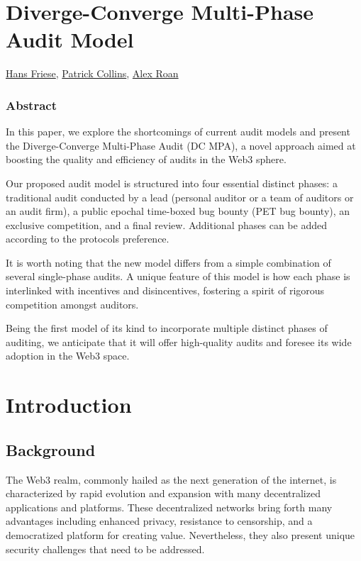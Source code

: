 \documentclass[10pt]{extarticle}
\begin{document}
\section*{Diverge-Converge Multi-Phase Audit
Model}\label{diverge-converge-multi-phase-audit-model}

\href{hans@cyfrin.io}{Hans Friese}, \href{patrick@cyfrin.io}{Patrick
Collins}, \href{alex@cyfrin.io}{Alex Roan}

\subsubsection*{Abstract}\label{abstract}

In this paper, we explore the shortcomings of current audit models and
present the Diverge-Converge Multi-Phase Audit (DC MPA), a novel
approach aimed at boosting the quality and efficiency of audits in the
Web3 sphere.

Our proposed audit model is structured into four essential distinct
phases: a traditional audit conducted by a lead (personal auditor or a
team of auditors or an audit firm), a public epochal time-boxed bug
bounty (PET bug bounty), an exclusive competition, and a final review.
Additional phases can be added according to the
protocol\textquotesingle s preference.

It is worth noting that the new model differs from a simple combination
of several single-phase audits. A unique feature of this model is how
each phase is interlinked with incentives and disincentives, fostering a
spirit of rigorous competition amongst auditors.

Being the first model of its kind to incorporate multiple distinct
phases of auditing, we anticipate that it will offer high-quality audits
and foresee its wide adoption in the Web3 space.

\section{Introduction}\label{1-introduction}

\subsection{Background}\label{11-background}

The Web3 realm, commonly hailed as the next generation of the internet,
is characterized by rapid evolution and expansion with many
decentralized applications and platforms. These decentralized networks
bring forth many advantages including enhanced privacy, resistance to
censorship, and a democratized platform for creating value.
Nevertheless, they also present unique security challenges that need to
be addressed.
\end{document}

